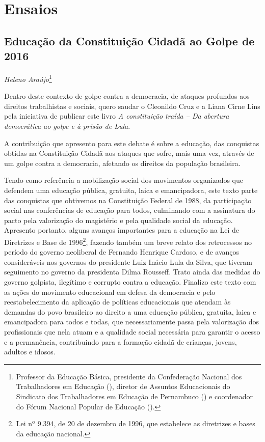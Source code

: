 \part{Ensaios}

\chapter*{Educação da Constituição Cidadã ao Golpe de 2016}


\begin{flushright}
\emph{Heleno Araújo}\footnote{Professor da Educação Básica, presidente da
  Confederação Nacional dos Trabalhadores em Educação (), diretor
  de Assuntos Educacionais do Sindicato dos Trabalhadores em Educação de
  Pernambuco () e coordenador do Fórum Nacional Popular de
  Educação ().}
\end{flushright}

Dentro deste contexto de golpe contra a democracia, de ataques profundos
aos direitos trabalhistas e sociais, quero saudar o Cleonildo Cruz e a
Liana Cirne Lins pela iniciativa de publicar este livro \emph{A constituição traída --
Da abertura democrática ao golpe e à prisão de Lula}.

A contribuição que apresento para este debate é sobre a educação, das
conquistas obtidas na Constituição Cidadã aos ataques que sofre, mais uma vez,
através de um golpe contra a democracia, afetando os direitos da
população brasileira.

Tendo como referência a mobilização social dos movimentos organizados
que defendem uma educação pública, gratuita, laica e emancipadora, este
texto parte das conquistas que obtivemos na Constituição Federal de
1988, da participação social nas conferências de educação para todos,
culminando com a assinatura do pacto pela valorização do magistério e
pela qualidade social da educação. Apresento portanto, alguns avanços
importantes para a educação na Lei de Diretrizes e Base de
1996\footnote{Lei nº 9.394, de 20 de dezembro de 1996, que
  estabelece as diretrizes e bases da educação nacional.}, fazendo
também um breve relato dos retrocessos no período do governo neoliberal
de Fernando Henrique Cardoso, e de avanços consideráveis nos governos do
presidente Luiz Inácio Lula da Silva, que tiveram seguimento no governo da
presidenta Dilma Rousseff. Trato ainda das medidas do governo golpista,
ilegítimo e corrupto contra a educação. Finalizo este texto com as ações
do movimento educacional em defesa da democracia e pelo
reestabelecimento da aplicação de políticas educacionais que atendam às
demandas do povo brasileiro ao direito a uma educação pública,
gratuita, laica e emancipadora para todos e todas, que necessariamente
passa pela valorização dos profissionais que nela atuam e a qualidade
social necessária para garantir o acesso e a permanência, contribuindo
para a formação cidadã de crianças, jovens, adultos e idosos.

